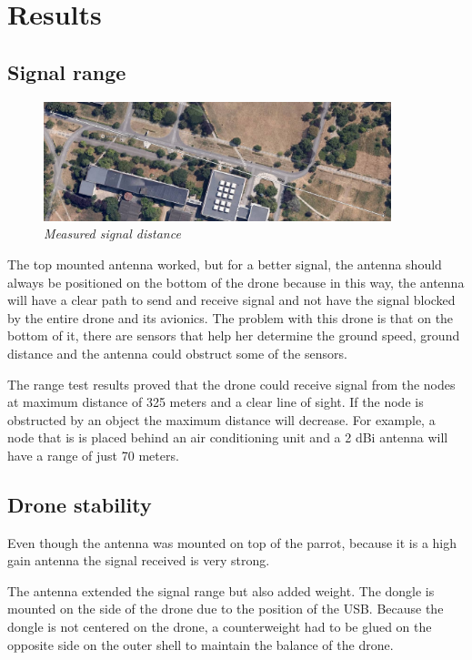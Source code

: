 \section{Results}


\subsection{Signal range}

\begin{figure}[ht]
\begin{center}
\includegraphics[width=0.9\textwidth]{img/distance.png}
\end{center}
\caption{\small \itshape{Measured signal distance}}
\end{figure}


The top mounted antenna worked, but for a better signal, the antenna should always be positioned on the bottom of the drone because in this way, the antenna will have a clear path to send and receive signal and not have the signal blocked by the entire drone and its avionics. The problem with this drone is that on the bottom of it, there are sensors that help her determine the ground speed, ground distance and the antenna could obstruct some of the sensors.

The range test results proved that the drone could receive signal from the nodes at maximum distance of 325 meters and a clear line of sight. If the node is obstructed by an object the maximum distance will decrease. For example, a node that is is placed behind an air conditioning unit and a 2 dBi antenna will have a range of just 70 meters.


\subsection{Drone stability}

Even though the antenna was mounted on top of the parrot, because it is a high gain antenna the signal received is very strong. 

The antenna extended the signal range but also added weight. The dongle is mounted on the side of the drone due to the position of the USB. Because the dongle is not centered on the drone, a counterweight had to be glued on the opposite side on the outer shell to maintain the balance of the drone. 

